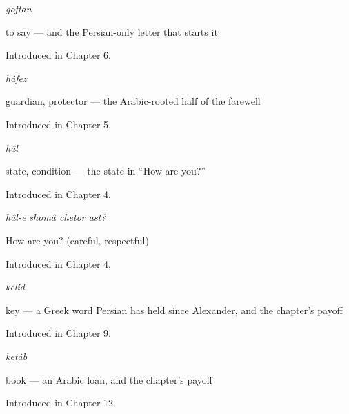 \noindent\begin{minipage}[t]{\linewidth}
\raggedright
\textbf{}\enspace\emph{goftan}\par
\small to say — and the Persian-only letter  that starts it\par
\footnotesize Introduced in Chapter 6.
\end{minipage}\par\medskip

\noindent\begin{minipage}[t]{\linewidth}
\raggedright
\textbf{}\enspace\emph{hâfez}\par
\small guardian, protector — the Arabic-rooted half of the farewell\par
\footnotesize Introduced in Chapter 5.
\end{minipage}\par\medskip

\noindent\begin{minipage}[t]{\linewidth}
\raggedright
\textbf{}\enspace\emph{hâl}\par
\small state, condition — the state in “How are you?”\par
\footnotesize Introduced in Chapter 4.
\end{minipage}\par\medskip

\noindent\begin{minipage}[t]{\linewidth}
\raggedright
\textbf{   }\enspace\emph{hâl-e shomâ chetor ast?}\par
\small How are you? (careful, respectful)\par
\footnotesize Introduced in Chapter 4.
\end{minipage}\par\medskip

\noindent\begin{minipage}[t]{\linewidth}
\raggedright
\textbf{}\enspace\emph{kelid}\par
\small key — a Greek word Persian has held since Alexander, and the chapter's payoff\par
\footnotesize Introduced in Chapter 9.
\end{minipage}\par\medskip

\noindent\begin{minipage}[t]{\linewidth}
\raggedright
\textbf{}\enspace\emph{ketâb}\par
\small book — an Arabic loan, and the chapter's payoff\par
\footnotesize Introduced in Chapter 12.
\end{minipage}\par\medskip

